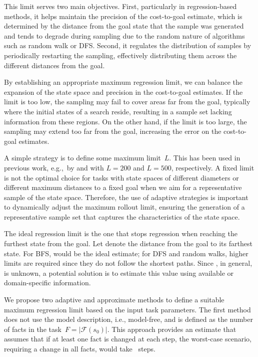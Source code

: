 This limit serves two main objectives. First, particularly in regression-based methods, it helps maintain the precision of the cost-to-goal estimate, which is determined by the distance from the goal state that the sample was generated and tends to degrade during sampling due to the random nature of algorithms such as random walk or DFS. Second, it regulates the distribution of samples by periodically restarting the sampling, effectively distributing them across the different distances from the goal.

By establishing an appropriate maximum regression limit, we can balance the expansion of the state space and precision in the cost-to-goal estimates. If the limit is too low, the sampling may fail to cover areas far from the goal, typically where the initial states of a search reside, resulting in a sample set lacking information from these regions. On the other hand, if the limit is too large, the sampling may extend too far from the goal, increasing the error on the cost-to-goal estimates.

A simple strategy is to define some maximum limit~$L$. This has been used in previous work, e.g.,~by \citet{yu2020learning} and \citet{otoole2022sampling} with $L=200$ and $L=500$, respectively. A fixed limit is not the optimal choice for tasks with state spaces of different diameters or different maximum distances to a fixed goal when we aim for a representative sample of the state space. Therefore, the use of adaptive strategies is important to dynamically adjust the maximum rollout limit, ensuring the generation of a representative sample set that captures the characteristics of the state space.

The ideal regression limit is the one that stops regression when reaching the furthest state from the goal. Let \ssdiameter denote the distance from the goal to its farthest state. For BFS, \ssdiameter would be the ideal estimate; for DFS and random walks, higher limits are required since they do not follow the shortest paths. Since \ssdiameter, in general, is unknown, a potential solution is to estimate this value using available or domain-specific information.

We propose two adaptive and approximate methods to define a suitable maximum regression limit based on the input task parameters. The first method does not use the model description, i.e., model-free, and is defined as the number of facts in the task~$F=|\mathcal{F}(s_0)|$. This approach provides an estimate that assumes that if at least one fact is changed at each step, the worst-case scenario, requiring a change in all facts, would take \facts~steps.

